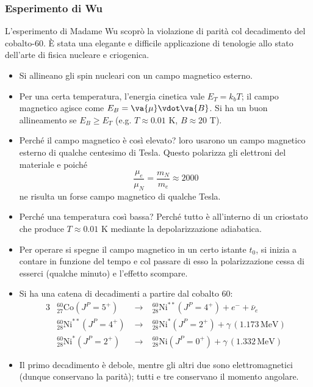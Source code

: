 \subsubsection{Esperimento di Wu}
L'esperimento di Madame Wu scoprò la violazione di parità col decadimento del cobalto-60. È stata una elegante e difficile applicazione di tenologie allo stato dell'arte di fisica nucleare e criogenica.
\begin{itemize}
    \item Si allineano gli spin nucleari con un campo magnetico esterno. 
    \item Per una certa temperatura, l'energia cinetica vale $E_T=k_bT$; il campo magnetico agisce come $E_B=\va{\mu}\vdot\va{B}$. Si ha un buon allineamento se $E_B\geq E_T$ (e.g. $T\approx0.01$ K, $B\approx20$ T).
    \item Perché il campo magnetico è così elevato? loro usarono un campo magnetico esterno di qualche centesimo di Tesla. Questo polarizza gli elettroni del materiale e poiché
    \begin{equation*}
        \frac{\mu_e}{\mu_N}=\frac{m_N}{m_e}\approx2000
    \end{equation*}
    ne risulta un forse campo magnetico di qualche Tesla.
    \item Perché una temperatura così bassa? Perché tutto è all'interno di un criostato che produce $T\approx0.01$ K mediante la depolarizzazione adiabatica.
    \item Per operare si spegne il campo magnetico in un certo istante $t_0$, si inizia a contare in funzione del tempo e col passare di esso la polarizzazione cessa di esserci (qualche minuto) e l'effetto scompare.
    \item Si ha una catena di decadimenti a partire dal cobalto 60:
    \begin{alignat*}{3}
    &^{60}_{27}\mathrm{Co}(J^P=5^+)   &\;\to\;&   ^{60}_{28}\mathrm{Ni}^{**}(J^P=4^+)+e^-+\bar{\nu}_e \\
    &^{60}_{28}\mathrm{Ni}^{**}(J^P=4^+)   &\;\to\;&   ^{60}_{28}\mathrm{Ni}^{*}(J^P=2^+)+\gamma\,(1.173\,\mathrm{MeV}) \\
    &^{60}_{28}\mathrm{Ni}^{*}(J^P=2^+)    &\;\to\;&   ^{60}_{28}\mathrm{Ni}(J^P=0^+)+\gamma\,(1.332\,\mathrm{MeV})
    \end{alignat*}
    \item Il primo decadimento è debole, mentre gli altri due sono elettromagnetici (dunque conservano la parità); tutti e tre conservano il momento angolare. 
    \begin{figure}[H]

\end{figure}
\end{itemize}
